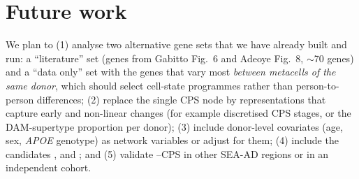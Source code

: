 \section{Future work}
We plan to (1) analyse two alternative gene sets that we have already built and run: a ``literature'' set (genes from Gabitto Fig.~6 and Adeoye Fig.~8, $\sim$70 genes) and a ``data only'' set with the genes that vary most \emph{between metacells of the same donor}, which should select cell-state programmes rather than person-to-person differences; (2) replace the single CPS node by representations that capture early and non-linear changes (for example discretised CPS stages, or the DAM-supertype proportion per donor); (3) include donor-level covariates (age, sex, \emph{APOE} genotype) as network variables or adjust for them; (4) include the candidates ,  and ; and (5) validate --CPS in other SEA-AD regions or in an independent cohort.

